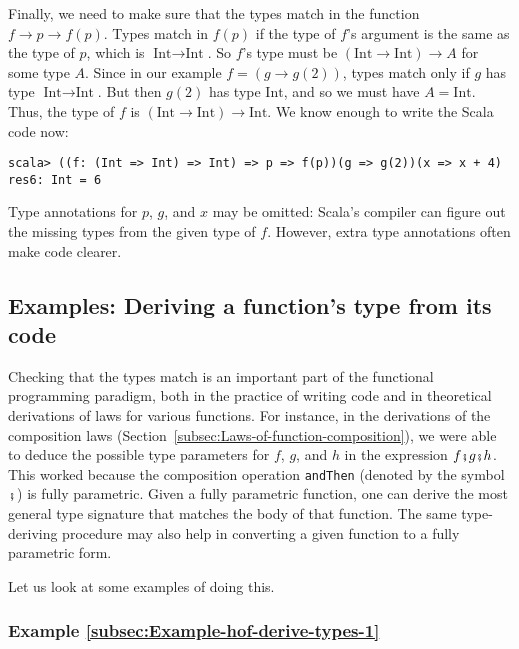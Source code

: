 Finally, we need to make sure that the types match in the function
$f\rightarrow p\rightarrow f(p)$. Types match in $f(p)$ if the type
of $f$\textsf{'}s argument is the same as the type of $p$, which is $\text{Int}\rightarrow\text{Int}$.
So $f$\textsf{'}s type must be $\left(\text{Int}\rightarrow\text{Int}\right)\rightarrow A$
for some type $A$. Since in our example $f=\left(g\rightarrow g(2)\right)$,
types match only if $g$ has type $\text{Int}\rightarrow\text{Int}$.
But then $g(2)$ has type $\text{Int}$, and so we must have $A=\text{Int}$.
Thus, the type of $f$ is $\left(\text{Int}\rightarrow\text{Int}\right)\rightarrow\text{Int}$.
We know enough to write the Scala code now:
\begin{lstlisting}
scala> ((f: (Int => Int) => Int) => p => f(p))(g => g(2))(x => x + 4)
res6: Int = 6
\end{lstlisting}
Type annotations for $p$, $g$, and $x$ may be omitted: Scala\textsf{'}s
compiler can figure out the missing types from the given type of $f$.
However, extra type annotations often make code clearer.

\subsection{Examples: Deriving a function\textsf{'}s type from its code}

Checking that the types match is an important part of the functional
programming paradigm, both in the practice of writing code and in
theoretical derivations of laws for various functions. For instance,
in the derivations of the composition laws (Section~\ref{subsec:Laws-of-function-composition}),
we were able to deduce the possible type parameters for $f$, $g$,
and $h$ in the expression $f\bef g\bef h$. This worked because the
composition operation \lstinline!andThen! (denoted by the symbol
$\bef$) is fully parametric. Given a fully parametric function, one
can derive the most general type signature that matches the body of
that function. The same type-deriving procedure may also help in converting
a given function to a fully parametric form.

Let us look at some examples of doing this.

\subsubsection{Example \label{subsec:Example-hof-derive-types-1}\ref{subsec:Example-hof-derive-types-1}}

